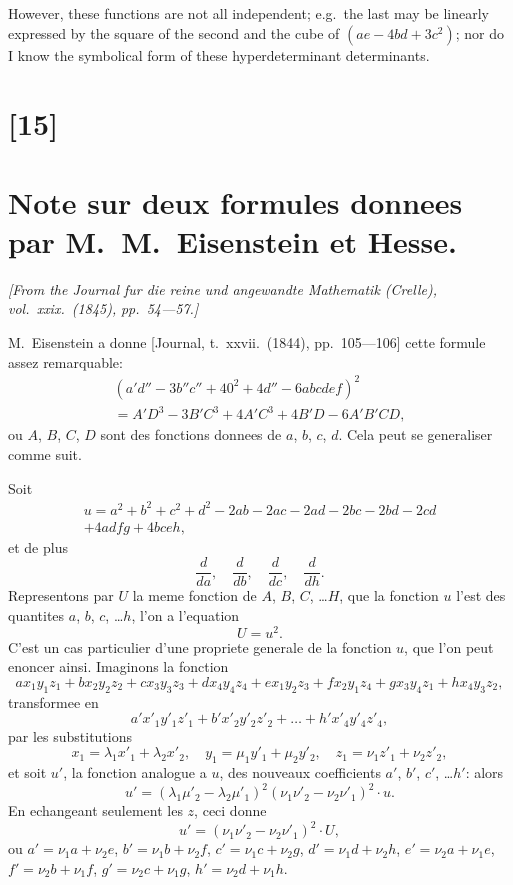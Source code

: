 \documentclass[11pt,a4paper]{book}
\begin{document}
However, these functions are not all independent; e.g.\ the last may be linearly
expressed by the square of the second and the cube of $(ae - 4bd + 3c^2)$; nor do
I know the symbolical form of these hyperdeterminant determinants.

\newpage
\section*{[15]}
\section*{Note sur deux formules donnees par M.~M.~Eisenstein et Hesse.}

\textit{[From the Journal fur die reine und angewandte Mathematik (Crelle), vol.~xxix.~(1845),}
\textit{pp.~54---57.]}

\bigskip
\setcounter{page}{113}

M.~Eisenstein a donne [Journal, t.~xxvii.~(1844), pp.~105---106] cette formule assez
remarquable:
\begin{multline*}
(a'd'' - 3b''c'' + 40^2 + 4d'' - 6abcdef)^2 \\
= A'D^3 - 3B'C^3 + 4A'C^3 + 4B'D - 6A'B'CD,
\end{multline*}
ou $A$, $B$, $C$, $D$ sont des fonctions donnees de $a$, $b$, $c$, $d$. Cela peut se generaliser comme
suit.

Soit
\begin{multline*}
u = a^2 + b^2 + c^2 + d^2 - 2ab - 2ac - 2ad - 2bc - 2bd - 2cd \\
+ 4adfg + 4bceh,
\end{multline*}
et de plus
\[
\frac{d}{da},\quad \frac{d}{db},\quad \frac{d}{dc},\quad \frac{d}{dh}.
\]
Representons par $U$ la meme fonction de $A$, $B$, $C$, \ldots $H$, que la fonction $u$ l'est des
quantites $a$, $b$, $c$, \ldots $h$, l'on a l'equation
\[
U = u^2.
\]
C'est un cas particulier d'une propriete generale de la fonction $u$, que l'on peut
enoncer ainsi. Imaginons la fonction
\[
ax_1y_1z_1 + bx_2y_2z_2 + cx_3y_3z_3 + dx_4y_4z_4 + ex_1y_2z_3 + fx_2y_1z_4 + gx_3y_4z_1 + hx_4y_3z_2,
\]
transformee en
\[
a'x'_1y'_1z'_1 + b'x'_2y'_2z'_2 + \ldots + h'x'_4y'_4z'_4,
\]
par les substitutions
\[
x_1 = \lambda_1 x'_1 + \lambda_2 x'_2,\quad
y_1 = \mu_1 y'_1 + \mu_2 y'_2,\quad
z_1 = \nu_1 z'_1 + \nu_2 z'_2,
\]
et soit $u'$, la fonction analogue a $u$, des nouveaux coefficients $a'$, $b'$, $c'$, \ldots $h'$: alors
\[
u' = (\lambda_1\mu'_2 - \lambda_2\mu'_1)^2 (\nu_1\nu'_2 - \nu_2\nu'_1)^2 \cdot u.
\]
En echangeant seulement les $z$, ceci donne
\[
u' = (\nu_1\nu'_2 - \nu_2\nu'_1)^2 \cdot U,
\]
ou $a' = \nu_1 a + \nu_2 e$, $b' = \nu_1 b + \nu_2 f$, $c' = \nu_1 c + \nu_2 g$, $d' = \nu_1 d + \nu_2 h$,
$e' = \nu_2 a + \nu_1 e$, $f' = \nu_2 b + \nu_1 f$, $g' = \nu_2 c + \nu_1 g$, $h' = \nu_2 d + \nu_1 h$.
\end{document}
